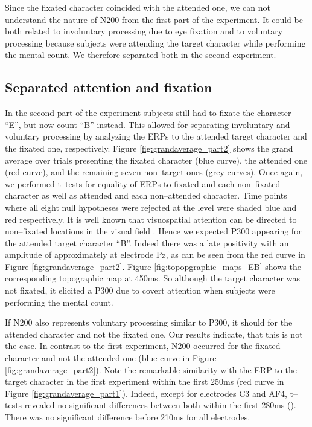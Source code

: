 \documentclass[a4paper,twocolumn]{article}
\begin{document}
Since the fixated character coincided with the attended one, we can not understand the nature of N200 from the first part of the experiment. It could be both related to involuntary processing due to eye fixation and to voluntary processing because subjects were attending the target character while performing the mental count. We therefore separated both in the second experiment.
\subsection*{Separated attention and fixation}
In the second part of the experiment subjects still had to fixate the character ``E'', but now count ``B'' instead. This allowed for separating involuntary and voluntary processing by analyzing the ERPs to the attended target character and the fixated one, respectively. Figure \ref{fig:grandaverage_part2} shows the grand average over trials presenting the fixated character (blue curve), the attended one (red curve), and the remaining seven non--target ones (grey curves). Once again, we performed t--tests for equality of ERPs to fixated and each non--fixated character as well as attended and each non--attended character. Time points where all eight null hypotheses were rejected at the  level were shaded blue and red respectively. 
It is well known that visuospatial attention can be directed to non--fixated locations in the visual field \cite{Posner1980}. Hence we expected P300 appearing for the attended target character ``B''. Indeed there was a late positivity with an amplitude of approximately  at electrode Pz, as can be seen from the red curve in Figure \ref{fig:grandaverage_part2}. Figure \ref{fig:topopgraphic_maps_EB} shows the corresponding topographic map at 450ms. So although the target character was not fixated, it elicited a P300 due to covert attention when subjects were performing the mental count. 

If N200 also represents voluntary processing similar to P300, it should  for the attended character and not the fixated one. Our results indicate, that this is not the case. In contrast to the first experiment, N200 occurred for the fixated character and not the attended one (blue curve in Figure \ref{fig:grandaverage_part2}). Note the remarkable similarity with the ERP to the target character in the first experiment within the first 250ms (red curve in Figure \ref{fig:grandaverage_part1}). Indeed, except for electrodes C3 and AF4, t--tests revealed no significant differences between both within the first 280ms (). There was no significant difference before 210ms for all electrodes.
\end{document}
